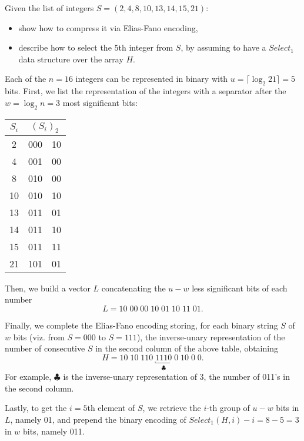 \exercise

Given the list of integers $S=(2,4,8,10,13,14,15,21)$:
%
\begin{itemize}
  \item show how to compress it via Elias-Fano encoding,
  \item describe how to select the 5th integer from $S$, by assuming to have a $Select_1$ data structure over the array $H$.
\end{itemize}

\solution

Each of the $n=16$ integers can be represented in binary with $u=\lceil\log_2
21\rceil=5$ bits. First, we list the representation of the integers with a
separator after the $w=\log_2n=3$ most significant bits:
%
\begin{center}
  \begin{tabular}{ c | r | l }
    $S_i$ & \multicolumn{2}{c}{$(S_i)_2$} \\ \hline
     2 & 000 & 10 \\
     4 & 001 & 00 \\
     8 & 010 & 00 \\
    10 & 010 & 10 \\
    13 & 011 & 01 \\
    14 & 011 & 10 \\
    15 & 011 & 11 \\
    21 & 101 & 01
  \end{tabular}
\end{center}
%
Then, we build a vector  $L$ concatenating the $u-w$ less significant bits of
each number
%
$$L = 10\; 00\; 00\; 10\; 01\; 10\; 11\; 01.$$

Finally, we complete the Elias-Fano encoding storing, for each binary string $S$
of $w$ bits (viz. from $S=000$ to $S=111$), the inverse-unary representation of
the number of consecutive $S$ in the second column of the above table, obtaining
%
$$H=10\;10\;110\;\underbracket{1110}_{\clubsuit}\;0\;10\;0\;0.$$
%
For example, $\clubsuit$ is the inverse-unary representation of 3, the number of
011's in the second column.

Lastly, to get the $i=5$th element of $S$, we retrieve the $i$-th group of $u-w$
bits in $L$, namely 01, and prepend the binary encoding of $Select_1(H,
i)-i=8-5=3$ in $w$ bits, namely 011.
